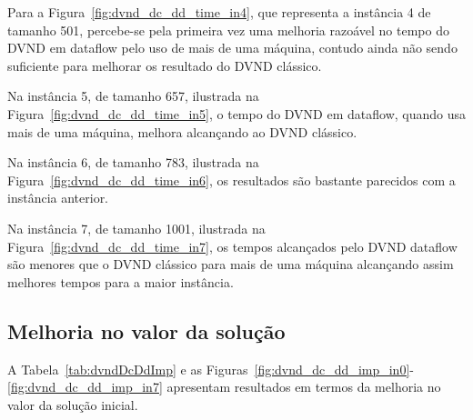 Para a Figura~\ref{fig:dvnd_dc_dd_time_in4}, que representa a instância 4 de tamanho 501, percebe-se pela primeira vez uma melhoria razoável no tempo do DVND em dataflow pelo uso de mais de uma máquina, contudo ainda não sendo suficiente para melhorar os resultado do DVND clássico.


Na instância 5, de tamanho 657, ilustrada na Figura~\ref{fig:dvnd_dc_dd_time_in5}, o tempo do DVND em dataflow, quando usa mais de uma máquina, melhora alcançando ao DVND clássico.


Na instância 6, de tamanho 783, ilustrada na Figura~\ref{fig:dvnd_dc_dd_time_in6}, os resultados são bastante parecidos com a instância anterior.


Na instância 7, de tamanho 1001, ilustrada na Figura~\ref{fig:dvnd_dc_dd_time_in7}, os tempos alcançados pelo DVND dataflow são menores que o DVND clássico para mais de uma máquina alcançando assim melhores tempos para a maior instância.


\subsection{Melhoria no valor da solução}

A Tabela~\ref{tab:dvndDcDdImp} e as Figuras~\ref{fig:dvnd_dc_dd_imp_in0}-\ref{fig:dvnd_dc_dd_imp_in7} apresentam resultados em termos da melhoria no valor da solução inicial.

